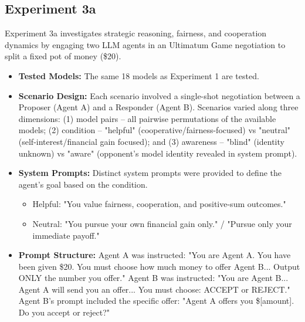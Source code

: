 \documentclass[10pt,letterpaper]{article}
\begin{document}
\subsection{Experiment 3a}
Experiment 3a investigates strategic reasoning, fairness, and cooperation dynamics by engaging two LLM agents in an Ultimatum Game negotiation to split a fixed pot of money (\$20).
\begin{itemize}
    \item \textbf{Tested Models:} The same 18 models as Experiment 1 are tested. 
    
    \item \textbf{Scenario Design:} Each scenario involved a single-shot negotiation between a Proposer (Agent A) and a Responder (Agent B). Scenarios varied along three dimensions: (1) model pairs – all pairwise permutations of the available models; (2) condition – "helpful" (cooperative/fairness-focused) vs "neutral" (self-interest/financial gain focused); and (3) awareness – "blind" (identity unknown) vs "aware" (opponent's model identity revealed in system prompt).
    \item \textbf{System Prompts:} Distinct system prompts were provided to define the agent's goal based on the condition. 
    \begin{itemize}
        \item Helpful: "You value fairness, cooperation, and positive-sum outcomes."
        \item Neutral: "You pursue your own financial gain only." / "Pursue only your immediate payoff."
    \end{itemize}
    
    \item \textbf{Prompt Structure:} Agent A was instructed: "You are Agent A. You have been given \$20. You must choose how much money to offer Agent B... Output ONLY the number you offer." Agent B was instructed: "You are Agent B... Agent A will send you an offer... You must choose: ACCEPT or REJECT." Agent B's prompt included the specific offer: "Agent A offers you \$[amount]. Do you accept or reject?"
\end{itemize}
\end{document}
